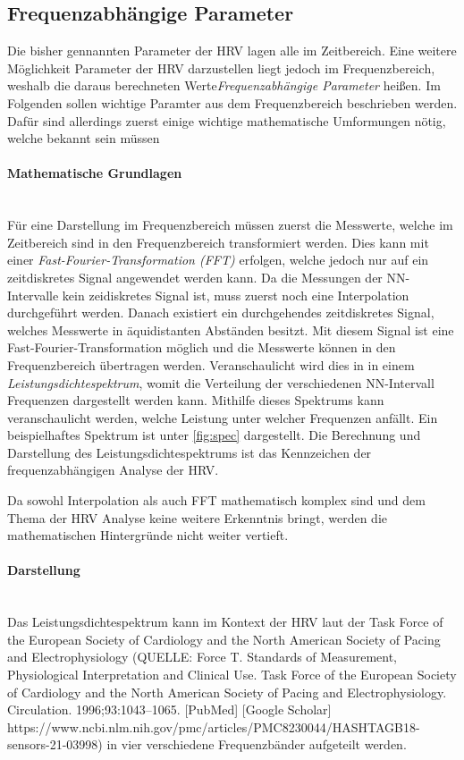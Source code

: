 \subsection{Frequenzabhängige Parameter}	

 Die bisher gennannten Parameter der HRV lagen alle im Zeitbereich. Eine weitere Möglichkeit Parameter der HRV darzustellen liegt jedoch im Frequenzbereich, weshalb die daraus berechneten Werte\textit{Frequenzabhängige Parameter} heißen. Im Folgenden sollen wichtige Paramter aus dem Frequenzbereich beschrieben werden. Dafür sind allerdings zuerst einige wichtige mathematische Umformungen nötig, welche bekannt sein müssen
 
 \paragraph{Mathematische Grundlagen}\mbox{} \\
 \color{red}
 Für eine Darstellung im Frequenzbereich müssen zuerst die Messwerte, welche im Zeitbereich sind in den Frequenzbereich transformiert werden. Dies kann mit einer \textit{Fast-Fourier-Transformation (FFT)} erfolgen, welche jedoch nur auf ein zeitdiskretes Signal angewendet werden kann. Da die Messungen der NN-Intervalle kein zeidiskretes Signal ist, muss zuerst noch eine Interpolation durchgeführt werden. Danach existiert ein durchgehendes zeitdiskretes Signal, welches Messwerte in äquidistanten Abständen besitzt. Mit diesem Signal ist eine Fast-Fourier-Transformation möglich und die Messwerte können in den Frequenzbereich übertragen werden. Veranschaulicht wird dies in in einem \textit{Leistungsdichtespektrum}, womit die Verteilung der verschiedenen NN-Intervall Frequenzen dargestellt werden kann. Mithilfe dieses Spektrums kann veranschaulicht werden, welche Leistung unter welcher Frequenzen anfällt. Ein beispielhaftes Spektrum ist unter \ref{fig:spec} dargestellt. Die Berechnung und Darstellung des Leistungsdichtespektrums ist das Kennzeichen der frequenzabhängigen Analyse der HRV.

 Da sowohl Interpolation als auch FFT mathematisch komplex sind und dem Thema der HRV Analyse keine weitere Erkenntnis bringt, werden die mathematischen Hintergründe nicht weiter vertieft.\\\color{black}
 
 \paragraph{Darstellung}\mbox{} \\
 Das Leistungsdichtespektrum kann im Kontext der HRV laut der Task Force of the European Society of Cardiology and the North American Society of Pacing and Electrophysiology (QUELLE: Force T. Standards of Measurement, Physiological Interpretation and Clinical Use. Task Force of the European Society of Cardiology and the North American Society of Pacing and Electrophysiology. Circulation. 1996;93:1043–1065. [PubMed] [Google Scholar] https://www.ncbi.nlm.nih.gov/pmc/articles/PMC8230044/HASHTAGB18-sensors-21-03998) in vier verschiedene Frequenzbänder aufgeteilt werden.
 
